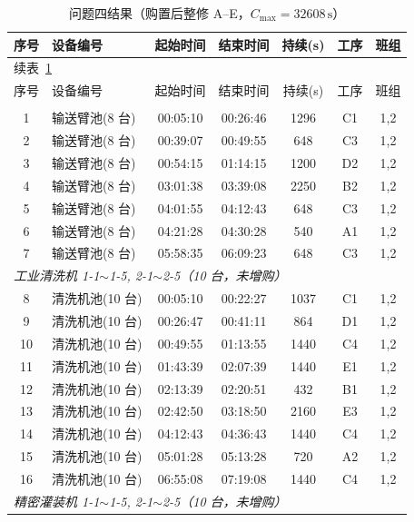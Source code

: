 \documentclass[12pt,a4paper]{ctexart}
\begin{document}
\begin{longtable}{c p{4.2cm} c c c c c}
\caption{问题四结果（购置后整修 A--E，$C_{\max}=32608\,\mathrm{s}$）}\label{tab:q4}\\
\toprule
序号 & 设备编号 & 起始时间 & 结束时间 & 持续(s) & 工序 & 班组 \\
\midrule
\endfirsthead
\multicolumn{7}{l}{\small 续表~\ref{tab:q4}}\\
\toprule
序号 & 设备编号 & 起始时间 & 结束时间 & 持续(s) & 工序 & 班组 \\
\midrule
\endhead
\bottomrule
\endfoot
\multicolumn{7}{l}{\textit{自动化输送臂 1-1$\sim$1-4, 2-1$\sim$2-4（8 台，未增购）}}\\
1 & 输送臂池(8 台) & 00:05:10 & 00:26:46 & 1296 & C1 & 1,2 \\
2 & 输送臂池(8 台) & 00:39:07 & 00:49:55 & 648 & C3 & 1,2 \\
3 & 输送臂池(8 台) & 00:54:15 & 01:14:15 & 1200 & D2 & 1,2 \\
4 & 输送臂池(8 台) & 03:01:38 & 03:39:08 & 2250 & B2 & 1,2 \\
5 & 输送臂池(8 台) & 04:01:55 & 04:12:43 & 648 & C3 & 1,2 \\
6 & 输送臂池(8 台) & 04:21:28 & 04:30:28 & 540 & A1 & 1,2 \\
7 & 输送臂池(8 台) & 05:58:35 & 06:09:23 & 648 & C3 & 1,2 \\
\midrule
\multicolumn{7}{l}{\textit{工业清洗机 1-1$\sim$1-5, 2-1$\sim$2-5（10 台，未增购）}}\\
8 & 清洗机池(10 台) & 00:05:10 & 00:22:27 & 1037 & C1 & 1,2 \\
9 & 清洗机池(10 台) & 00:26:47 & 00:41:11 & 864 & D1 & 1,2 \\
10 & 清洗机池(10 台) & 00:49:55 & 01:13:55 & 1440 & C4 & 1,2 \\
11 & 清洗机池(10 台) & 01:43:39 & 02:07:39 & 1440 & E1 & 1,2 \\
12 & 清洗机池(10 台) & 02:13:39 & 02:20:51 & 432 & B1 & 1,2 \\
13 & 清洗机池(10 台) & 02:42:50 & 03:18:50 & 2160 & E3 & 1,2 \\
14 & 清洗机池(10 台) & 04:12:43 & 04:36:43 & 1440 & C4 & 1,2 \\
15 & 清洗机池(10 台) & 05:01:28 & 05:13:28 & 720 & A2 & 1,2 \\
16 & 清洗机池(10 台) & 06:55:08 & 07:19:08 & 1440 & C4 & 1,2 \\
\midrule
\multicolumn{7}{l}{\textit{精密灌装机 1-1$\sim$1-5, 2-1$\sim$2-5（10 台，未增购）}}\\

\end{longtable}
\end{document}
